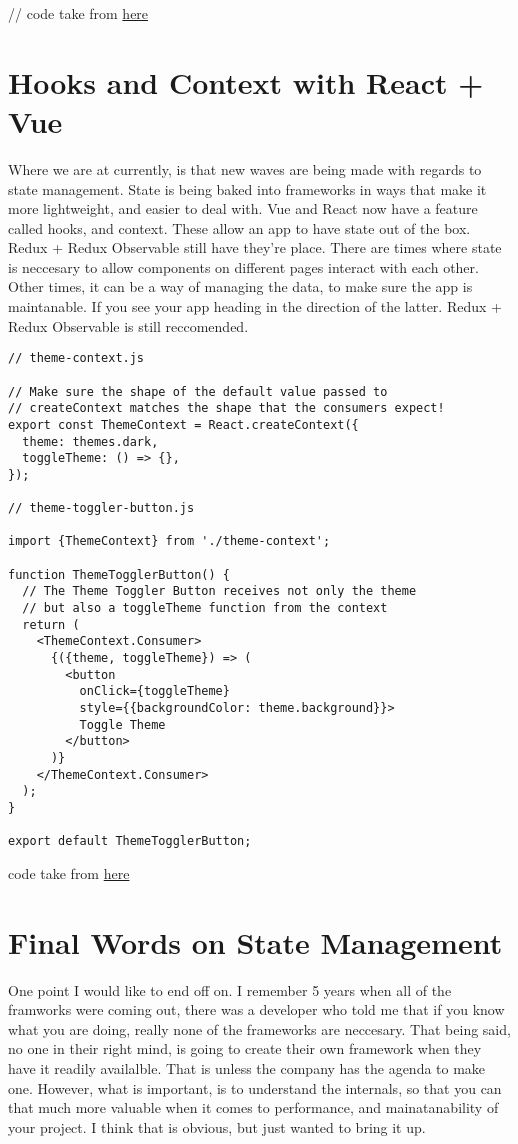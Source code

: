 // code take from \href{https://github.com/CharlieGreenman/angularPixel_illustrator}{here}

\section{ Hooks and Context with React + Vue }
Where we are at currently, is that new waves are being made with regards to
state management. State is being baked into frameworks in ways that make it
more lightweight, and easier to deal with. Vue and React now have a feature
called hooks, and context. These allow an app to have state out of the box.
Redux + Redux Observable still have they're place. There are times where state
is neccesary to allow components on different pages interact with each other.
Other times, it can be a way of managing the data, to make sure the app is
maintanable. If you see your app heading in the direction of the latter. Redux +
Redux Observable is still reccomended.

\begin{lstlisting}
// theme-context.js

// Make sure the shape of the default value passed to
// createContext matches the shape that the consumers expect!
export const ThemeContext = React.createContext({
  theme: themes.dark,
  toggleTheme: () => {},
});

// theme-toggler-button.js

import {ThemeContext} from './theme-context';

function ThemeTogglerButton() {
  // The Theme Toggler Button receives not only the theme
  // but also a toggleTheme function from the context
  return (
    <ThemeContext.Consumer>
      {({theme, toggleTheme}) => (
        <button
          onClick={toggleTheme}
          style={{backgroundColor: theme.background}}>
          Toggle Theme
        </button>
      )}
    </ThemeContext.Consumer>
  );
}

export default ThemeTogglerButton;
\end{lstlisting}
code take from \href{https://reactjs.org/docs/context.html}{here}

\section{ Final Words on State Management }
One point I would like to end off on. I remember 5 years when all of the
framworks were coming out, there was a developer who told me that if you know
what you are doing, really none of the frameworks are neccesary. That being said,
no one in their right mind, is going to create their own framework when they have
it readily availalble. That is unless the company has the agenda to make one.
However, what is important, is to understand the internals, so that you can
that much more valuable when it comes to performance, and mainatanability of
your project. I think that is obvious, but just wanted to bring it up.

